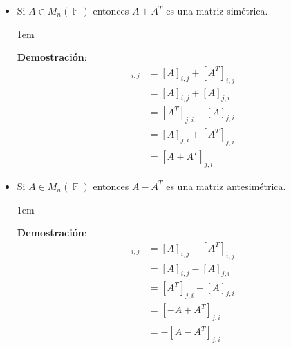 \documentclass[12pt, fleqn]{report}                             %
\newenvironment{SmallIndentation}[1][0.75em]                    %
        {\begin{adjustwidth}{#1}{}\begin{footnotesize}}             %
        {\end{footnotesize}\end{adjustwidth}}                       %
\theoremstyle{break}                                            %
\DeclareMathOperator \GenericField {\mathbb{F}}                 %
\begin{document}
                    \begin{itemize}

                        \item Si $A \in M_{n}(\GenericField)$ entonces $A+A^T$ es una matriz simétrica. 

                            \begin{SmallIndentation}[1em]
                                \textbf{Demostración}:
                                \begin{align*}
                                    [A + A^T]_{i,j}  
                                        &=  [A]_{i,j} + [A^T]_{i,j}     \\ 
                                        &=  [A]_{i,j} + [A]_{j,i}       \\
                                        &=  [A^T]_{j,i} + [A]_{j,i}     \\
                                        &=  [A]_{j,i} + [A^T]_{j, i}    \\
                                        &=  [A + A^T]_{j, i}             
                                \end{align*}

                            \end{SmallIndentation}

                        \item Si $A \in M_{n}(\GenericField)$ entonces $A-A^T$ es una matriz antesimétrica. 

                            \begin{SmallIndentation}[1em]
                                \textbf{Demostración}:
                                \begin{align*}
                                    [A-A^T]_{i,j}   
                                        &=  [A]_{i,j} - [A^T]_{i,j}     \\ 
                                        &=  [A]_{i,j} - [A]_{j,i}       \\
                                        &=  [A^T]_{j,i} - [A]_{j,i}     \\
                                        &=  [-A+A^T]_{j, i}             \\
                                        &= -[A - A^T]_{j, i}
                                \end{align*}


\end{SmallIndentation}
\end{itemize}
\end{document}
